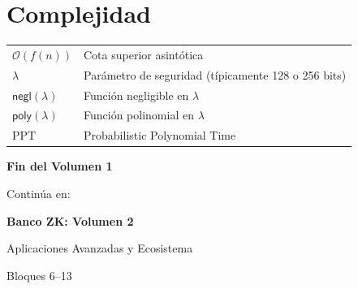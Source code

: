 \documentclass[11pt,a4paper,twoside,openright]{book}
\theoremstyle{definition}
\theoremstyle{plain}
\theoremstyle{remark}
\begin{document}
\section*{Complejidad}
\begin{tabular}{ll}
$\mathcal{O}(f(n))$ & Cota superior asintótica \\
$\lambda$ & Parámetro de seguridad (típicamente 128 o 256 bits) \\
$\mathsf{negl}(\lambda)$ & Función negligible en $\lambda$ \\
$\mathsf{poly}(\lambda)$ & Función polinomial en $\lambda$ \\
PPT & Probabilistic Polynomial Time \\
\end{tabular}

\cleardoublepage

\thispagestyle{empty}
\begin{center}
\vspace*{3cm}

{\Huge\textbf{Fin del Volumen 1}}

\vspace{2cm}

{\Large Continúa en:}

\vspace{0.5cm}

{\LARGE\textbf{Banco ZK: Volumen 2}}

\vspace{0.3cm}

{\large Aplicaciones Avanzadas y Ecosistema}

\vspace{0.2cm}

{\large Bloques 6--13}

\vspace{3cm}


\end{center}
\cleardoublepage
\end{document}
